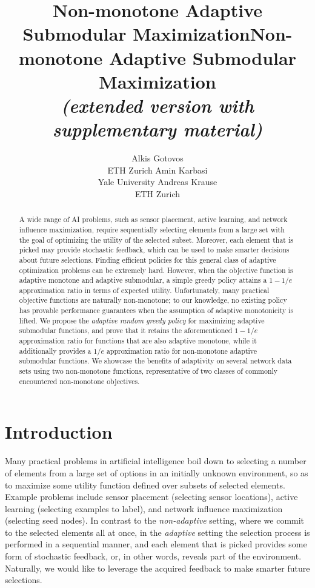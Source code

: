 \documentclass{article}
\title{Non-monotone Adaptive Submodular Maximization}
\title{Non-monotone Adaptive Submodular Maximization\\\emph{\footnotesize (extended version with supplementary material)}}
\author{Alkis Gotovos\\
ETH Zurich
\And
Amin Karbasi\\
Yale University
\And
Andreas Krause\\
ETH Zurich}
\begin{document}
\maketitle

\begin{abstract}
A wide range of AI problems, such as sensor placement, active learning, and network influence maximization, require sequentially selecting elements from a large set with the goal of optimizing the utility of the selected subset.
Moreover, each element that is picked may provide stochastic feedback, which can be used to make smarter decisions about future selections.
Finding efficient policies for this general class of adaptive optimization problems can be extremely hard.
However, when the objective function is adaptive monotone and adaptive submodular, a simple greedy policy attains a $1-1/e$ approximation ratio in terms of expected utility.
Unfortunately, many practical objective functions are naturally non-monotone; to our knowledge, no existing policy has provable performance guarantees when the assumption of adaptive monotonicity is lifted.
We propose the \emph{adaptive random greedy policy} for maximizing adaptive submodular functions, and prove that it retains the aforementioned $1-1/e$ approximation ratio for functions that are also adaptive monotone, while it additionally provides a $1/e$ approximation ratio for non-monotone adaptive submodular functions.
We showcase the benefits of adaptivity on several network data sets using two non-monotone functions, representative of two classes of commonly encountered non-monotone objectives.
\end{abstract}

\section{Introduction}

Many practical problems in artificial intelligence boil down to selecting a number of elements from a large set of options in an initially unknown environment, so as to maximize some utility function defined over subsets of selected elements.
Example problems include sensor placement (selecting sensor locations), active learning (selecting examples to label), and network influence maximization (selecting seed nodes).
In contrast to the \emph{non-adaptive} setting, where we commit to the selected elements all at once, in the \emph{adaptive} setting the selection process is performed in a sequential manner, and each element that is picked provides some form of stochastic feedback, or, in other words, reveals part of the environment.
Naturally, we would like to leverage the acquired feedback to make smarter future selections.
\end{document}

